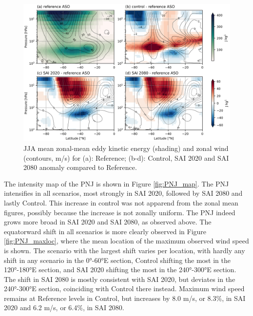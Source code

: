 \begin{figure}[H]
	\centering
	\includegraphics[width=0.95\linewidth]{images/PNJ_EKE_U_zmdiff.png}
	\caption{JJA mean zonal-mean eddy kinetic energy (shading) and zonal wind (contours, m/s) for (a): Reference; (b-d): Control, SAI 2020 and SAI 2080 anomaly compared to Reference.}
	\label{fig:PNJ_EKE_U_zmdiff}
\end{figure}

The intensity map of the PNJ is shown in Figure \ref{fig:PNJ_map}. The PNJ intensifies in all scenarios, most strongly in SAI 2020, followed by SAI 2080 and lastly Control. This increase in control was not apparend from the zonal mean figures, possibly because the increase is not zonally uniform. The PNJ indeed grows more broad in SAI 2020 and SAI 2080, as observed above. The equatorward shift in all scenarios is more clearly observed in Figure \ref{fig:PNJ_maxloc}, where the mean location of the maximum observed wind speed is shown. The scenario with the largest shift varies per location, with hardly any shift in any scenario in the 0°-60°E section, Control shifting the most in the 120°-180°E section, and SAI 2020 shifting the most in the 240°-300°E section. The shift in SAI 2080 is mostly consistent with SAI 2020, but deviates in the 240°-300°E section, coinciding with Control there instead. Maximum wind speed remains at Reference levels in Control, but increases by 8.0 m/s, or 8.3\%, in SAI 2020 and 6.2 m/s, or 6.4\%, in SAI 2080.

